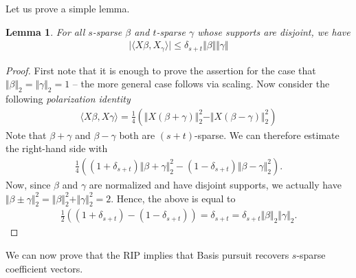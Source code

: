 \documentclass{article}
\newcommand{\sprod}[1]{\langle #1 \rangle}
\newtheorem{lemma}{Lemma}
\newcommand{\abs}[1]{\vert #1 \vert}
\newcommand{\norm}[1]{\Vert #1 \Vert}
\begin{document}
Let us prove a simple lemma.
\begin{lemma}
    For all $s$-sparse $\beta$ and $t$-sparse $\gamma$ whose supports are disjoint, we have
    \begin{align*}
        \abs{\sprod{X\beta,X_\gamma}} \leq \delta_{s+t} \norm{\beta}\norm{\gamma}
    \end{align*}
\end{lemma}
\begin{proof}

    First note that it is enough to prove the assertion for the case that $\norm{\beta}_2=\norm{\gamma}_2=1$ -- the more general case follows via scaling. Now consider the following \emph{polarization identity}
    \begin{align*}
        \sprod{X\beta,X\gamma} = \frac{1}{4}\left( \norm{X(\beta+\gamma)}_2^2 - \norm{X(\beta-\gamma)}_2^2\right)
    \end{align*}
    Note that $\beta+\gamma$ and $\beta-\gamma$ both are $(s+t)$-sparse. We can therefore estimate the right-hand side with 
    \begin{align*}
        \frac{1}{4}((1+\delta_{s+t})\norm{\beta+\gamma}_2^2 - (1-\delta_{s+t})\norm{\beta- \gamma}^2_2).
    \end{align*}
    Now, since $\beta$ and $\gamma$ are normalized and have disjoint supports, we actually have $\norm{\beta \pm \gamma}_2^2 = \norm{\beta}_2^2+\norm{\gamma}_2^2=2$. Hence, the above is equal to
    \begin{align*}
        \frac{1}{2}((1+\delta_{s+t}) - (1-\delta_{s+t})) = \delta_{s+t} = \delta_{s+t}\norm{\beta}_2\norm{\gamma}_2.
    \end{align*}
\end{proof}
We can now prove that the RIP implies that Basis pursuit recovers $s$-sparse coefficient vectors.
\end{document}
